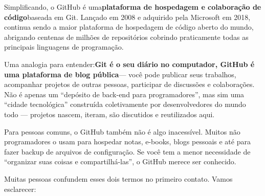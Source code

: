 


Simplificando, o GitHub é uma\textbf{plataforma de hospedagem e colaboração de código}baseada em Git. Lançado em 2008 e adquirido pela Microsoft em 2018, continua sendo a maior plataforma de hospedagem de código aberto do mundo, abrigando centenas de milhões de repositórios cobrindo praticamente todas as principais linguagens de programação.

Uma analogia para entender:\textbf{Git é o seu diário no computador, GitHub é uma plataforma de blog pública}— você pode publicar seus trabalhos, acompanhar projetos de outras pessoas, participar de discussões e colaborações. Não é apenas um “depósito de back-end para programadores”, mas sim uma “cidade tecnológica” construída coletivamente por desenvolvedores do mundo todo — projetos nascem, iteram, são discutidos e reutilizados aqui.

Para pessoas comuns, o GitHub também não é algo inacessível. Muitos não programadores o usam para hospedar notas, e-books, blogs pessoais e até para fazer backup de arquivos de configuração. Se você tem a menor necessidade de “organizar suas coisas e compartilhá-las”, o GitHub merece ser conhecido.


Muitas pessoas confundem esses dois termos no primeiro contato. Vamos esclarecer:

